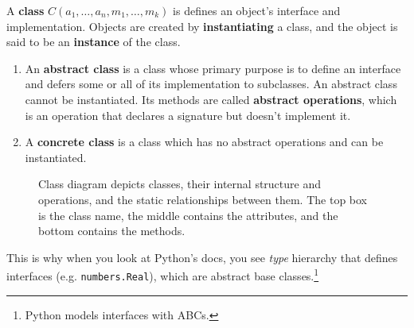 \begin{definition}[Class]
  A \textbf{class} $C(a_1, \ldots, a_n, m_1, \ldots, m_k)$ is defines an object's interface and implementation. Objects are created by \textbf{instantiating} a class, and the object is said to be an \textbf{instance} of the class. 
  \begin{enumerate}
    \item An \textbf{abstract class} is a class whose primary purpose is to define an interface and defers some or all of its implementation to subclasses. An abstract class cannot be instantiated. Its methods are called \textbf{abstract operations}, which is an operation that declares a signature but doesn't implement it.\footnotemark
    \item A \textbf{concrete class} is a class which has no abstract operations and can be instantiated. 
  \end{enumerate}
  
  \begin{figure}[H]
    \centering 
    {
    }
    \caption{Class diagram depicts classes, their internal structure and operations, and the static relationships between them. The top box is the class name, the middle contains the attributes, and the bottom contains the methods.} 
    \label{fig:class_diagram}
  \end{figure}

\end{definition}


This is why when you look at Python's docs, you see \textit{type} hierarchy that defines interfaces (e.g. \texttt{numbers.Real}), which are abstract base classes.\footnote{Python models interfaces with ABCs. }

